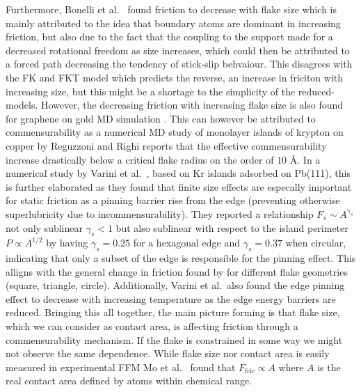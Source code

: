 Furthermore, Bonelli et al.\ \cite{bonelli_atomistic_2009} found friction to decrease with flake size which is mainly attributed to the idea that boundary
atoms are dominant in increasing friction, but also due to the fact that the coupling to the support made for a decreased rotational freedom as size increases, which could then be attributed to a forced path decreasing the tendency of stick-slip behvaiour. This disagrees with the \acrshort{FK} and \acrshort{FKT} model which predicts the reverse, an increase in friciton with increasing size, but this might be a shortage to the simplicity of the reduced-models. However, the decreasing friction with increasing flake size is also found for graphene on gold \acrshort{MD} simulation \cite{zhu_study_2018}. This can however be attributed to commensurability as a numerical \acrshort{MD} study of monolayer islands of krypton on copper by Reguzzoni and Righi \cite{PhysRevB.85.201412} reports that the effective commensurability increase drastically below a critical flake radius on the order of $10$ Å. In a numerical study
by Varini et al.\ \cite{Varini_2015}, based on Kr islands adsorbed on Pb(111), this is further elaborated as they found that finite size effects are especally important for static friction as a pinning barrier rise from
the edge (preventing otherwise superlubricity due to incommensurability). They reported a relationship $F_s \sim A^{\gamma_s}$ not only sublinear $\gamma_s <
1$ but also sublinear with respect to the island perimeter $P \propto A^{1/2}$ by having $\gamma_s = 0.25$ for a hexagonal edge and $\gamma_s = 0.37$ when circular, indicating that only a subset of
the edge is responsible for the pinning effect. This alligns with the general change in friction found by \cite{zhu_study_2018} for different flake geometries (square, triangle, circle). Additionally, Varini et al.\ also found the edge pinning effect to decrease with increasing temperature as the edge energy barriers are reduced. Bringing this all together, the main picture forming is that flake size, which we can consider as contact area, is affecting friction through a commensurability mechanism. If the flake is constrained in some way we might not observe the same dependence. While flake size nor contact area is easily measured in experimental \acrshort{FFM}  Mo et al.\ \cite{mo_friction_2009} found that $F_{\text{fric}} \propto A$ where $A$ is the real contact area defined by atoms within chemical range.

